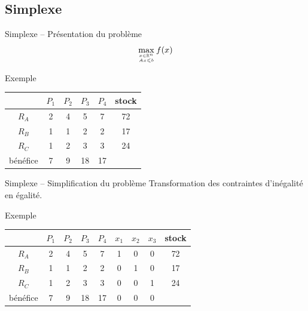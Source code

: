 \documentclass{beamer}
\begin{document}
\subsection{Simplexe}
  \begin{frame}{Simplexe -- Présentation du problème}
    \[\max_{x \in \mathbb{R}^n \atop Ax \leqslant b} f(x)\]
    \begin{exampleblock}{Exemple}
      \begin{center}
        \begin{tabular}{|c|cccc|c|}\hline
          & $P_1$ & $P_2$ & $P_3$ & $P_4$ & stock \\ \hline
          $R_A$ & 2 & 4 & 5 & 7 & 72 \\
          $R_B$ & 1 & 1 & 2 & 2 & 17 \\
          $R_C$ & 1 & 2 & 3 & 3 & 24 \\ \hline
          bénéfice & 7 & 9 & 18 & 17 &  \\ \hline
        \end{tabular}
      \end{center}
    \end{exampleblock}
  \end{frame}

  \begin{frame}{Simplexe -- Simplification du problème}
    Transformation des contraintes d'inégalité en égalité.

    \begin{exampleblock}{Exemple}
      \begin{center}
        \begin{tabular}{|c|ccccccc|c|}\hline
          & $P_1$ & $P_2$ & $P_3$ & $P_4$ & $x_1$ & $x_2$ & $x_3$ & stock \\ \hline
          $R_A$ & 2 & 4 & 5 & 7 & 1 & 0 & 0 & 72 \\
          $R_B$ & 1 & 1 & 2 & 2 & 0 & 1 & 0 & 17 \\
          $R_C$ & 1 & 2 & 3 & 3 & 0 & 0 & 1 & 24 \\ \hline
          bénéfice & 7 & 9 & 18 & 17 & 0 & 0 & 0 & \\ \hline
        \end{tabular}
      \end{center}
    \end{exampleblock}
  \end{frame}
\end{document}
